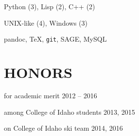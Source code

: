 \documentclass[margin]{res}
\begin{document}
\begin{resume}
\begin{multicols}{2}
    \begin{details}
    \item Python (3), Lisp (2), C++ (2)
    \end{details}
    
    \begin{details}
    \item UNIX-like (4), Windows (3)
    \end{details}   
  
    \begin{details}
    \item pandoc, \TeX, \texttt{git}, SAGE, MySQL 
    \end{details}   

\end{multicols}

\section{HONORS} \vspace{10pt}

\begin{description}[noitemsep,topsep=0pt]
        \item[Heritage Scholarship] for academic merit \hfill 2012 -- 2016
    	\item[Top Putnam Score] among College of Idaho students \hfill 2013, 2015
        \item[Varsity Skier] on College of Idaho ski team  \hfill 2014, 2016
\end{description}

\end{resume}
\end{document}
